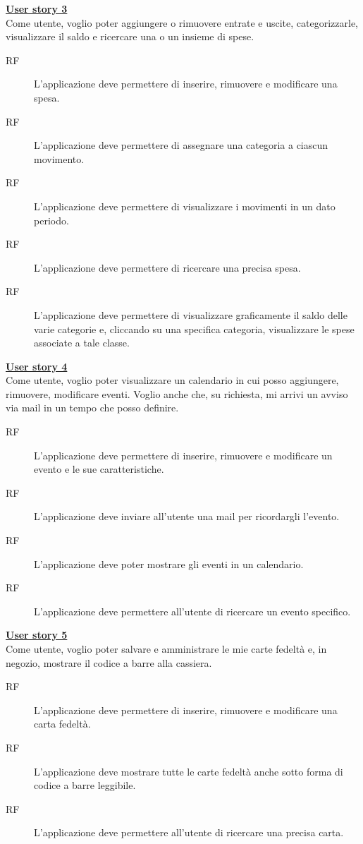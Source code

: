 \documentclass[a4paper,12pt]{article}
\begin{document}
 \underline{\textbf {User story 3}} \\
Come utente, voglio poter aggiungere o rimuovere entrate e uscite, categorizzarle, visualizzare il saldo e ricercare una o un insieme di spese.
\begin{description}
\item [RF] L'applicazione deve permettere di inserire, rimuovere e modificare una spesa.
\item [RF] L'applicazione deve permettere di assegnare una categoria a ciascun movimento.
\item [RF] L'applicazione deve permettere di visualizzare i movimenti in un dato periodo.
\item [RF] L'applicazione deve permettere di ricercare una precisa spesa.
\item [RF] L'applicazione deve permettere di visualizzare graficamente il saldo delle varie categorie e, cliccando su una specifica categoria, visualizzare le spese associate a tale classe.
\end{description}


 \underline{\textbf {User story 4}} \\
Come utente, voglio poter visualizzare un calendario in cui posso aggiungere, rimuovere, modificare eventi. Voglio anche che, su richiesta, mi arrivi un avviso via mail in un tempo che posso definire. 
\begin{description}
\item [RF] L'applicazione deve permettere di inserire, rimuovere e modificare un evento e le sue caratteristiche.
\item [RF] L'applicazione deve inviare all'utente una mail per ricordargli l'evento.
\item [RF]L'applicazione deve poter mostrare gli eventi in un calendario.
\item [RF] L'applicazione deve permettere all'utente di ricercare un evento specifico. 
\end{description}


\underline{\textbf {User story 5}} \\
Come utente, voglio poter salvare e amministrare le mie carte fedeltà e, in  negozio, mostrare il codice a barre alla cassiera.
\begin{description}
\item [RF] L'applicazione deve permettere di inserire, rimuovere e modificare una carta fedeltà.
\item [RF] L'applicazione deve mostrare tutte le carte fedeltà anche sotto forma di codice a barre leggibile.
\item [RF] L'applicazione deve permettere all'utente di ricercare una precisa carta.
\end{description}
\end{document}
